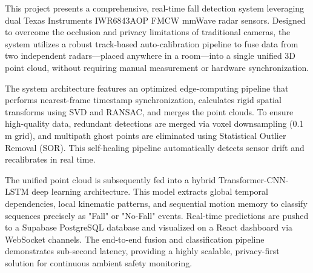 \vspace{-1cm}

This project presents a comprehensive, real-time fall detection system leveraging dual Texas Instruments IWR6843AOP FMCW mmWave radar sensors. Designed to overcome the occlusion and privacy limitations of traditional cameras, the system utilizes a robust track-based auto-calibration pipeline to fuse data from two independent radars—placed anywhere in a room—into a single unified 3D point cloud, without requiring manual measurement or hardware synchronization.

The system architecture features an optimized edge-computing pipeline that performs nearest-frame timestamp synchronization, calculates rigid spatial transforms using SVD and RANSAC, and merges the point clouds. To ensure high-quality data, redundant detections are merged via voxel downsampling (0.1 m grid), and multipath ghost points are eliminated using Statistical Outlier Removal (SOR). This self-healing pipeline automatically detects sensor drift and recalibrates in real time.

The unified point cloud is subsequently fed into a hybrid Transformer-CNN-LSTM deep learning architecture. This model extracts global temporal dependencies, local kinematic patterns, and sequential motion memory to classify sequences precisely as "Fall" or "No-Fall" events. Real-time predictions are pushed to a Supabase PostgreSQL database and visualized on a React dashboard via WebSocket channels. The end-to-end fusion and classification pipeline demonstrates sub-second latency, providing a highly scalable, privacy-first solution for continuous ambient safety monitoring.

\pagebreak